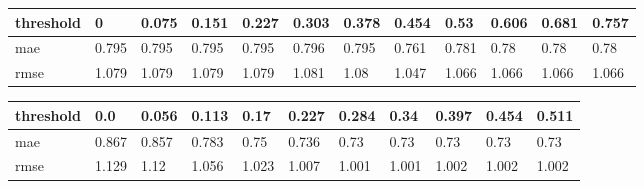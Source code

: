 \begin{appendices}
\begin{center}\label{tab7}
	\begin{tabularx}{\textwidth}{|l|X|X|X|X|X|X|X|X|X|X|X|}
		\hline
		threshold & 0 & 0.075 & 0.151 & 0.227 & 0.303 & 0.378 & 0.454 & 0.53 & 0.606 & 0.681 & 0.757 \\ \hline
		mae & 0.795 & 0.795 & 0.795 & 0.795 & 0.796 & 0.795 & 0.761 & 0.781 & 0.78 & 0.78 & 0.78 \\ \hline
		rmse & 1.079 & 1.079 & 1.079 & 1.079 & 1.081 & 1.08 & 1.047 & 1.066 & 1.066 & 1.066 & 1.066 \\ \hline
	\end{tabularx}	
\end{center}

\begin{center}\label{tab8}
	\begin{tabularx}{\textwidth}{|l|X|X|X|X|X|X|X|X|X|X|}	
		\hline
		threshold & 0.0 & 0.056 & 0.113 & 0.17 & 0.227 & 0.284 & 0.34 & 0.397 & 0.454 & 0.511 \\ \hline
		mae & 0.867 & 0.857 & 0.783 & 0.75 & 0.736 & 0.73 & 0.73 & 0.73 & 0.73 & 0.73 \\ \hline
		rmse & 1.129 & 1.12 & 1.056 & 1.023 & 1.007 & 1.001 & 1.001 & 1.002 & 1.002 & 1.002 \\ \hline
	\end{tabularx}	
\end{center}



\end{appendices}
